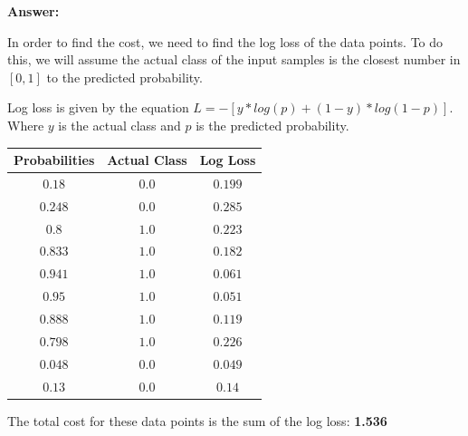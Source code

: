 \documentclass[12pt]{article}
\begin{document}
\begin{enumerate}
\begin{enumerate}
                    \textbf{Answer:}

                    In order to find the cost, we need to find the log loss of
                    the data points. To do this, we will assume the actual class
                    of the input samples is the closest number in $[0, 1]$ to
                    the predicted probability.

                    Log loss is given by the equation $L = -[y * log(p) + (1 -
                        y) * log(1 - p)]$. Where $y$ is the actual class and $p$
                    is the predicted probability.

                    \begin{table}[h]
                        \centering
                        \begin{tabular}{c|c|c}
                            \textbf{Probabilities} & \textbf{Actual Class} & \textbf{Log Loss} \\
                            \hline
                            $0.18$                 & $0.0$                 & $0.199$           \\
                            $0.248$                & $0.0$                 & $0.285$           \\
                            $0.8$                  & $1.0$                 & $0.223$           \\
                            $0.833$                & $1.0$                 & $0.182$           \\
                            $0.941$                & $1.0$                 & $0.061$           \\
                            $0.95$                 & $1.0$                 & $0.051$           \\
                            $0.888$                & $1.0$                 & $0.119$           \\
                            $0.798$                & $1.0$                 & $0.226$           \\
                            $0.048$                & $0.0$                 & $0.049$           \\
                            $0.13$                 & $0.0$                 & $0.14$            \\
                        \end{tabular}
                    \end{table}

                    The total cost for these data points is the sum of the log
                    loss: \textbf{1.536}
          \end{enumerate}


\end{enumerate}
\end{document}
